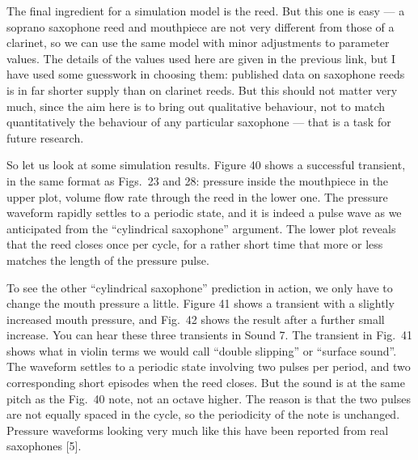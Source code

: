   The final ingredient for a simulation model is the reed. But this one is easy 
  — a soprano saxophone reed and mouthpiece are not very different from those 
  of a clarinet, so we can use the same model with minor adjustments to 
  parameter values. The details of the values used here are given in the 
  previous link, but I have used some guesswork in choosing them: published 
  data on saxophone reeds is in far shorter supply than on clarinet reeds. But 
  this should not matter very much, since the aim here is to bring out 
  qualitative behaviour, not to match quantitatively the behaviour of any 
  particular saxophone — that is a task for future research. 

  So let us look at some simulation results. Figure 40 shows a successful 
  transient, in the same format as Figs.\ 23 and 28: pressure inside the 
  mouthpiece in the upper plot, volume flow rate through the reed in the lower 
  one. The pressure waveform rapidly settles to a periodic state, and it is 
  indeed a pulse wave as we anticipated from the “cylindrical saxophone” 
  argument. The lower plot reveals that the reed closes once per cycle, for a 
  rather short time that more or less matches the length of the pressure pulse. 


  To see the other “cylindrical saxophone” prediction in action, we only have 
  to change the mouth pressure a little. Figure 41 shows a transient with a 
  slightly increased mouth pressure, and Fig.\ 42 shows the result after a 
  further small increase. You can hear these three transients in Sound 7. The 
  transient in Fig.\ 41 shows what in violin terms we would call “double 
  slipping” or “surface sound”. The waveform settles to a periodic state 
  involving two pulses per period, and two corresponding short episodes when 
  the reed closes. But the sound is at the same pitch as the Fig.\ 40 note, not 
  an octave higher. The reason is that the two pulses are not equally spaced in 
  the cycle, so the periodicity of the note is unchanged. Pressure waveforms 
  looking very much like this have been reported from real saxophones [5]. 


